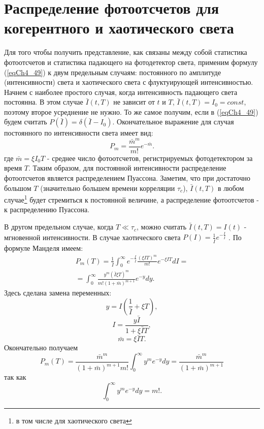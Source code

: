 \section{Распределение фотоотсчетов для когерентного и хаотического
  света}
Для того чтобы получить представление, как связаны между собой
статистика фотоотсчетов и статистика падающего на фотодетектор света,
применим формулу (\ref{eqCh4_49}) к двум предельным случаям:
постоянного по амплитуде (интенсивности) света и хаотического света с
флуктуирующей 
интенсивностью. Начнем с наиболее простого случая, когда интенсивность падающего
света постоянна. В этом случае $\bar{I}\left(t, T\right)$ не зависит
от $t$ и $T$, $\bar{I}\left(t, T\right) = I_0 = const$,  поэтому  
второе усреднение не нужно. То же самое получим, если в
(\ref{eqCh4_49}) будем считать $P\left(\bar{I}\right) =
\delta\left(\bar{I} - I_0\right)$.  Окончательное выражение для случая 
постоянного по интенсивности света имеет вид: 
\begin{equation}
P_m = \frac{\bar{m}^m}{m!}e^{- \bar{m}}.
\label{eqCh4_50}
\end{equation}
где $\bar{m} = \xi I_0 T$ - среднее число фотоотсчетов, регистрируемых
фотодетектором за время $T$.  Таким образом, для постоянной
интенсивности распределение фотоотсчетов является распределением
Пуассона. Заметим, что при достаточно большом $T$ (значительно большем
времени корреляции $\tau_c$), $\bar{I}\left(t, T\right)$  в любом
случае\footnote{в том числе для хаотического света}  будет стремиться к
постоянной величине, а распределение фотоотсчетов - к распределению
Пуассона. 
  
В другом предельном случае, когда $T \ll \tau_c$,  можно считать
$\bar{I}\left(t, T\right) = I\left(t\right)$ - мгновенной
интенсивности. В случае хаотического света $P\left(I\right) =
\frac{1}{\bar{I}} e^{- \frac{I}{\bar{I}}}$ \cite{bLoudon1976}.  
По формуле Манделя имеем:
\begin{eqnarray}
P_m\left(T\right) = \frac{1}{\bar{I}}\int_0^{\infty} e^{- \frac{I}{\bar{I}}}
\frac{\left(\xi I T\right)^m}{m!} e^{-
  \xi I T} d I = 
\nonumber \\
= \int_0^{\infty} \frac{y^m\left(\bar{I} \xi
  T\right)^m}{m!\left(1 + \bar{m}\right)^{m + 1}} e^{-y} dy.
\label{eqCh4_51}
\end{eqnarray}
Здесь сделана замена переменных:
\[
y = I \left(\frac{1}{\bar{I}} + \xi T\right),
\]
\[
I = \frac{y \bar{I}}{1 + \xi \bar{I} T},
\]
\[
\bar{m} = \xi \bar{I} T.
\]
Окончательно получаем
\begin{equation}
P_m\left(T\right) = 
\frac{\bar{m}^m}{\left(1 + \bar{m}\right)^{m + 1} m!}
\int_0^{\infty}y^m e^{-y}dy = 
\frac{\bar{m}^m}{\left(1 + \bar{m}\right)^{m + 1}}
\label{eqCh4_52}
\end{equation}
так как
\[
\int_0^{\infty}y^m e^{-y}dy = m!.
\]

